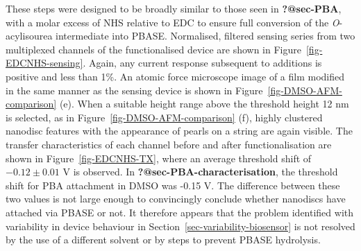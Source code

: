 \documentclass[
  a4paper,
]{scrbook}
\begin{document}
These steps were designed to be broadly similar to those seen in
\textbf{?@sec-PBA}, with a molar excess of NHS relative to EDC to ensure
full conversion of the \emph{O}-acylisourea intermediate into PBASE.
Normalised, filtered sensing series from two multiplexed channels of the
functionalised device are shown in Figure~\ref{fig-EDCNHS-sensing}.
Again, any current response subsequent to additions is positive and less
than 1\%. An atomic force microscope image of a film modified in the
same manner as the sensing device is shown in
Figure~\ref{fig-DMSO-AFM-comparison} (e). When a suitable height range
above the threshold height 12 nm is selected, as in
Figure~\ref{fig-DMSO-AFM-comparison} (f), highly clustered nanodisc
features with the appearance of pearls on a string are again visible.
The transfer characteristics of each channel before and after
functionalisation are shown in Figure~\ref{fig-EDCNHS-TX}, where an
average threshold shift of \(-0.12 \pm 0.01\) V is observed. In
\textbf{?@sec-PBA-characterisation}, the threshold shift for PBA
attachment in DMSO was -0.15 V. The difference between these two values
is not large enough to convincingly conclude whether nanodiscs have
attached via PBASE or not. It therefore appears that the problem
identified with variability in device behaviour in
Section~\ref{sec-variability-biosensor} is not resolved by the use of a
different solvent or by steps to prevent PBASE hydrolysis.
\end{document}
